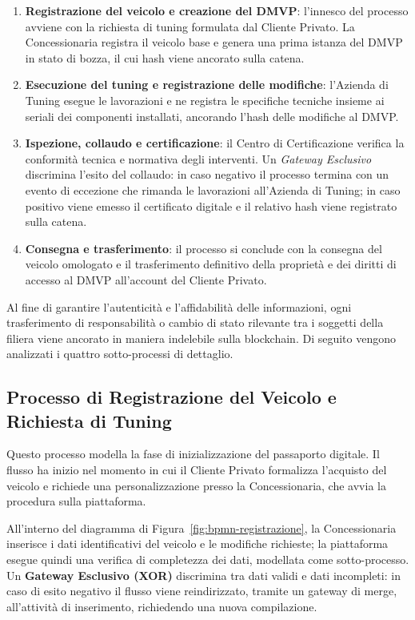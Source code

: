 \begin{enumerate}
    \item \textbf{Registrazione del veicolo e creazione del DMVP}: l'innesco del processo avviene con la richiesta di tuning formulata dal Cliente Privato. La Concessionaria registra il veicolo base e genera una prima istanza del DMVP in stato di bozza, il cui hash viene ancorato sulla catena.
    \item \textbf{Esecuzione del tuning e registrazione delle modifiche}: l'Azienda di Tuning esegue le lavorazioni e ne registra le specifiche tecniche insieme ai seriali dei componenti installati, ancorando l'hash delle modifiche al DMVP.
    \item \textbf{Ispezione, collaudo e certificazione}: il Centro di Certificazione verifica la conformità tecnica e normativa degli interventi. Un \textit{Gateway Esclusivo} discrimina l'esito del collaudo: in caso negativo il processo termina con un evento di eccezione che rimanda le lavorazioni all'Azienda di Tuning; in caso positivo viene emesso il certificato digitale e il relativo hash viene registrato sulla catena.
    \item \textbf{Consegna e trasferimento}: il processo si conclude con la consegna del veicolo omologato e il trasferimento definitivo della proprietà e dei diritti di accesso al DMVP all'account del Cliente Privato.
\end{enumerate}

Al fine di garantire l'autenticità e l'affidabilità delle informazioni, ogni trasferimento di responsabilità o cambio di stato rilevante tra i soggetti della filiera viene ancorato in maniera indelebile sulla blockchain. Di seguito vengono analizzati i quattro sotto-processi di dettaglio.

\subsection*{Processo di Registrazione del Veicolo e Richiesta di Tuning}

Questo processo modella la fase di inizializzazione del passaporto digitale. Il flusso ha inizio nel momento in cui il Cliente Privato formalizza l'acquisto del veicolo e richiede una personalizzazione presso la Concessionaria, che avvia la procedura sulla piattaforma.

All'interno del diagramma di Figura~\ref{fig:bpmn-registrazione}, la Concessionaria inserisce i dati identificativi del veicolo e le modifiche richieste; la piattaforma esegue quindi una verifica di completezza dei dati, modellata come sotto-processo. Un \textbf{Gateway Esclusivo (XOR)} discrimina tra dati validi e dati incompleti: in caso di esito negativo il flusso viene reindirizzato, tramite un gateway di merge, all'attività di inserimento, richiedendo una nuova compilazione.

